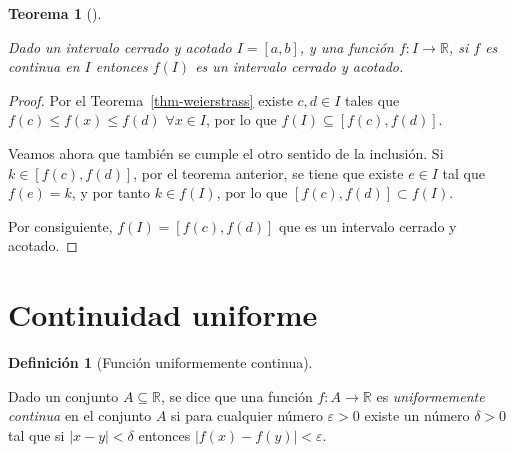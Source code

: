 \documentclass[
  a4paper,
]{scrreport}
\theoremstyle{definition}
\theoremstyle{definition}
\theoremstyle{definition}
\newtheorem{definition}{Definición}[chapter]
\theoremstyle{plain}
\newtheorem{theorem}{Teorema}[chapter]
\theoremstyle{plain}
\theoremstyle{plain}
\theoremstyle{remark}
\begin{document}
\begin{theorem}[]\protect\hypertarget{thm-imagen-funcion-continua-intervalo-cerrado-acotado}{}\label{thm-imagen-funcion-continua-intervalo-cerrado-acotado}

Dado un intervalo cerrado y acotado \(I=[a,b]\), y una función
\(f:I\to\mathbb{R}\), si \(f\) es continua en \(I\) entonces \(f(I)\) es
un intervalo cerrado y acotado.

\end{theorem}

\begin{tcolorbox}[enhanced jigsaw, bottomtitle=1mm, title=\textcolor{quarto-callout-note-color}{\faInfo}\hspace{0.5em}{Demostración}, colbacktitle=quarto-callout-note-color!10!white, coltitle=black, leftrule=.75mm, colback=white, toptitle=1mm, toprule=.15mm, titlerule=0mm, opacitybacktitle=0.6, colframe=quarto-callout-note-color-frame, bottomrule=.15mm, arc=.35mm, rightrule=.15mm, breakable, left=2mm, opacityback=0]

\begin{proof}
Por el Teorema~\ref{thm-weierstrass} existe \(c,d\in I\) tales que
\(f(c)\leq f(x)\leq f(d)\) \(\forall x\in I\), por lo que
\(f(I)\subseteq[f(c), f(d)]\).

Veamos ahora que también se cumple el otro sentido de la inclusión. Si
\(k\in[f(c),f(d)]\), por el teorema anterior, se tiene que existe
\(e\in I\) tal que \(f(e)=k\), y por tanto \(k\in f(I)\), por lo que
\([f(c),f(d)]\subset f(I)\).

Por consiguiente, \(f(I)=[f(c),f(d)]\) que es un intervalo cerrado y
acotado.
\end{proof}

\end{tcolorbox}

\section{Continuidad uniforme}\label{continuidad-uniforme}

\begin{definition}[Función uniformemente
continua]\protect\hypertarget{def-funcion-continua-uniformemente}{}\label{def-funcion-continua-uniformemente}

Dado un conjunto \(A\subseteq \mathbb{R}\), se dice que una función
\(f:A\to \mathbb{R}\) es \emph{uniformemente continua} en el conjunto
\(A\) si para cualquier número \(\varepsilon>0\) existe un número
\(\delta>0\) tal que si \(|x-y|<\delta\) entonces
\(|f(x)-f(y)|<\varepsilon.\)

\end{definition}
\end{document}
